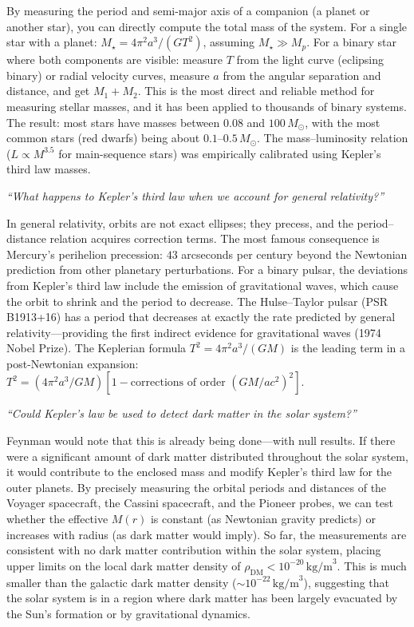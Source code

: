 By measuring the period and semi-major axis of a companion (a planet or another star), you can directly compute the total mass of the system. For a single star with a planet: $M_\star = 4\pi^2 a^3/(GT^2)$, assuming $M_\star \gg M_p$. For a binary star where both components are visible: measure $T$ from the light curve (eclipsing binary) or radial velocity curves, measure $a$ from the angular separation and distance, and get $M_1 + M_2$. This is the most direct and reliable method for measuring stellar masses, and it has been applied to thousands of binary systems. The result: most stars have masses between $0.08$ and $100\,M_\odot$, with the most common stars (red dwarfs) being about $0.1$--$0.5\,M_\odot$. The mass--luminosity relation ($L \propto M^{3.5}$ for main-sequence stars) was empirically calibrated using Kepler's third law masses.

\textit{``What happens to Kepler's third law when we account for general relativity?''}

In general relativity, orbits are not exact ellipses; they precess, and the period--distance relation acquires correction terms. The most famous consequence is Mercury's perihelion precession: $43$ arcseconds per century beyond the Newtonian prediction from other planetary perturbations. For a binary pulsar, the deviations from Kepler's third law include the emission of gravitational waves, which cause the orbit to shrink and the period to decrease. The Hulse--Taylor pulsar (PSR B1913+16) has a period that decreases at exactly the rate predicted by general relativity---providing the first indirect evidence for gravitational waves (1974 Nobel Prize). The Keplerian formula $T^2 = 4\pi^2 a^3/(GM)$ is the leading term in a post-Newtonian expansion: $T^2 = (4\pi^2 a^3/GM)[1 - \text{corrections of order $(GM/ac^2)^2$}]$.

\textit{``Could Kepler's law be used to detect dark matter in the solar system?''}

Feynman would note that this is already being done---with null results. If there were a significant amount of dark matter distributed throughout the solar system, it would contribute to the enclosed mass and modify Kepler's third law for the outer planets. By precisely measuring the orbital periods and distances of the Voyager spacecraft, the Cassini spacecraft, and the Pioneer probes, we can test whether the effective $M(r)$ is constant (as Newtonian gravity predicts) or increases with radius (as dark matter would imply). So far, the measurements are consistent with no dark matter contribution within the solar system, placing upper limits on the local dark matter density of $\rho_{\text{DM}} < 10^{-20}\,\text{kg/m}^3$. This is much smaller than the galactic dark matter density ($\sim 10^{-22}\,\text{kg/m}^3$), suggesting that the solar system is in a region where dark matter has been largely evacuated by the Sun's formation or by gravitational dynamics.

